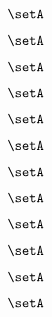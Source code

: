 {\begin{forslides}
        \begin{equation}
            \label{eq:slides-translation-37}
            \setA
        \end{equation}

        \begin{equation}
            \label{eq:slides-translation-38}
            \setA
        \end{equation}

        \begin{equation}
            \label{eq:slides-translation-39}
            \setA
        \end{equation}

        \begin{equation}
            \label{eq:slides-translation-40}
            \setA
        \end{equation}

        \begin{equation}
            \label{eq:slides-translation-41}
            \setA
        \end{equation}

        \begin{equation}
            \label{eq:slides-translation-42}
            \setA
        \end{equation}

        \begin{equation}
            \label{eq:slides-translation-43}
            \setA
        \end{equation}

        \begin{equation}
            \label{eq:slides-translation-44}
            \setA
        \end{equation}

        \begin{equation}
            \label{eq:slides-translation-45}
            \setA
        \end{equation}

        \begin{equation}
            \label{eq:slides-translation-46}
            \setA
        \end{equation}

        \begin{equation}
            \label{eq:slides-translation-47}
            \setA
        \end{equation}

        \begin{equation}
            \label{eq:slides-translation-48}
            \setA
        \end{equation}


\end{forslides}}
